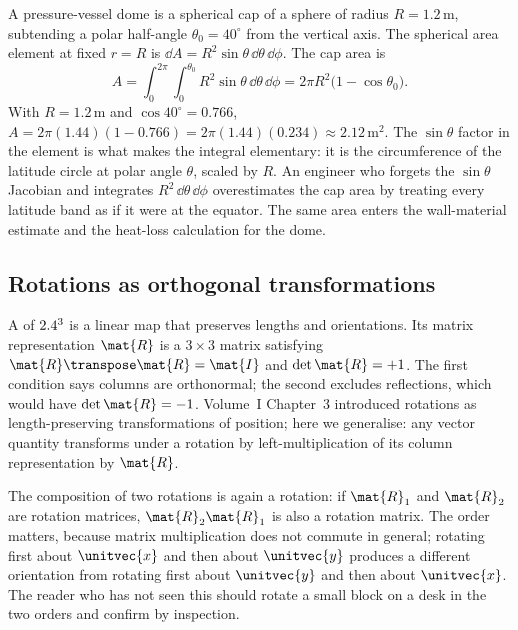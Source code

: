 \begin{example}
A pressure-vessel dome is a spherical cap of a sphere of radius
$R = 1.2\,\si{\meter}$, subtending a polar half-angle $\theta_{0} =
40^{\circ}$ from the vertical axis. The spherical area element at
fixed $r = R$ is $\dd A = R^{2}\sin\theta\,\dd\theta\,\dd\phi$. The
cap area is
\[
A = \int_{0}^{2\pi}\int_{0}^{\theta_{0}} R^{2}\sin\theta\,\dd\theta\,
\dd\phi = 2\pi R^{2}\big(1 - \cos\theta_{0}\big).
\]
With $R = 1.2\,\si{\meter}$ and $\cos 40^{\circ} = 0.766$,
$A = 2\pi(1.44)(1 - 0.766) = 2\pi(1.44)(0.234) \approx 2.12\,
\si{\meter\squared}$. The $\sin\theta$ factor in the element is what
makes the integral elementary: it is the circumference of the
latitude circle at polar angle $\theta$, scaled by $R$. An engineer
who forgets the $\sin\theta$ Jacobian and integrates $R^{2}\,\dd\theta
\,\dd\phi$ overestimates the cap area by treating every latitude band
as if it were at the equator. The same area enters the wall-material
estimate and the heat-loss calculation for the dome.
\end{example}

\subsection{Rotations as orthogonal transformations}

A  of $2.4^{3}$ is a linear map that preserves
lengths and orientations. Its matrix representation $\mat{R}$ is a
$3 \times 3$ matrix satisfying $\mat{R}\transpose\mat{R} = \mat{I}$
and $\det\mat{R} = +1$. The first condition says columns are
orthonormal; the second excludes reflections, which would have
$\det\mat{R} = -1$. Volume~I Chapter~3 introduced rotations as
length-preserving transformations of position; here we generalise:
any vector quantity transforms under a rotation by left-multiplication
of its column representation by $\mat{R}$.

The composition of two rotations is again a rotation: if $\mat{R}_{1}$
and $\mat{R}_{2}$ are rotation matrices, $\mat{R}_{2} \mat{R}_{1}$ is
also a rotation matrix. The order matters, because matrix
multiplication does not commute in general; rotating first about
$\unitvec{x}$ and then about $\unitvec{y}$ produces a different
orientation from rotating first about $\unitvec{y}$ and then about
$\unitvec{x}$. The reader who has not seen this should rotate a
small block on a desk in the two orders and confirm by inspection.

